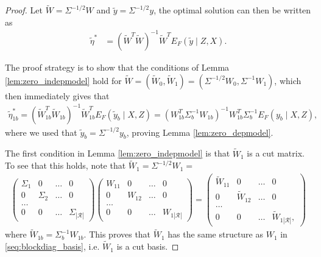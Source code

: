 \begin{proof}
Let $\widetilde{W}= \Sigma^{-1/2} W$ and $\tilde{y}= \Sigma^{-1/2} y$, the optimal solution can then be written as
\begin{align}
  \widetilde{\eta}^*&= (\widetilde{W}^T \widetilde{W})^{-1} \widetilde{W}^T E_F(\widetilde{y} \mid Z,X).
\nonumber
\end{align}

The proof strategy is to show that the conditions of Lemma \ref{lem:zero_indepmodel} hold for $\widetilde{W}=(\widetilde{W}_0,\widetilde{W}_1)=(\Sigma^{-1/2} W_0, \Sigma^{-1} W_1)$, which then immediately gives that
\begin{align}
  \widetilde{\eta}_{1b}^*= (\widetilde{W}_{1b}^T \widetilde{W}_{1b})^{-1} \widetilde{W}_{1b}^T E_F(\tilde{y}_b \mid X,Z)=
 (W_{1b}^T \Sigma_b^{-1} W_{1b})^{-1} W_{1b}^T \Sigma_b^{-1} E_F(y_b \mid X,Z),
\nonumber
\end{align}
where we used that $\tilde{y}_b= \Sigma^{-1/2} y_b$, proving Lemma \ref{lem:zero_depmodel}.

The first condition in Lemma \ref{lem:zero_indepmodel} is that $\widetilde{W}_1$ is a cut matrix. To see that this holds, note that
$ \widetilde{W}_1= \Sigma^{-1/2} W_1=$
\begin{align}
\begin{pmatrix} \Sigma_1 & 0 & \ldots & 0 \\
0 & \Sigma_2 & \ldots & 0 \\
\ldots & & & \\
0 & 0 & \ldots & \Sigma_{|\mathcal{R}|} \end{pmatrix}
\begin{pmatrix} 
W_{11} & 0 & \ldots &  0 \\
0 & W_{12} & \ldots & 0 \\
\ldots & & & \\
0 & 0 & \ldots & W_{1|\mathcal{R}|}
\end{pmatrix}
\nonumber
=\begin{pmatrix} 
\widetilde{W}_{11} & 0 & \ldots &  0 \\
0 & \widetilde{W}_{12} & \ldots & 0 \\
\ldots & & & \\
0 & 0 & \ldots & \widetilde{W}_{1|\mathcal{R}|},
\end{pmatrix}
\end{align}
where $\widetilde{W}_{1b}= \Sigma_b^{-1} W_{1b}$. 
This proves that $\widetilde{W}_1$ has the same structure as $W_1$ in \ref{seq:blockdiag_basis}, i.e. $\widetilde{W}_1$ is a cut basis.


\end{proof}

